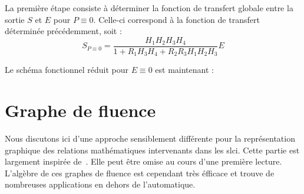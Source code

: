 La première étape consiste à déterminer la fonction de transfert globale entre
la sortie $S$ et $E$ pour $P\equiv0$.
Celle-ci correspond à la fonction de transfert déterminée précédemment, soit :
$$
     S_{P\equiv0}=\dfrac{H_1H_2H_3H_4}{1+R_1H_3H_4+R_2R_3H_1H_2H_3}E
$$

Le schéma fonctionnel réduit pour $E\equiv0$ est maintenant :

\begin{center}
\end{center}


\section{Graphe de fluence}
Nous discutons ici d'une approche sensiblement différente 
pour la représentation graphique des relations mathématiques 
intervenants dans les \gls{slci}. Cette partie est largement
inspirée de~\cite{Ostertag}. Elle peut être omise au cours 
d'une première lecture. L'algèbre de ces graphes de fluence
est cependant très éfficace et trouve de nombreuses applications 
en dehors de l'automatique. 

